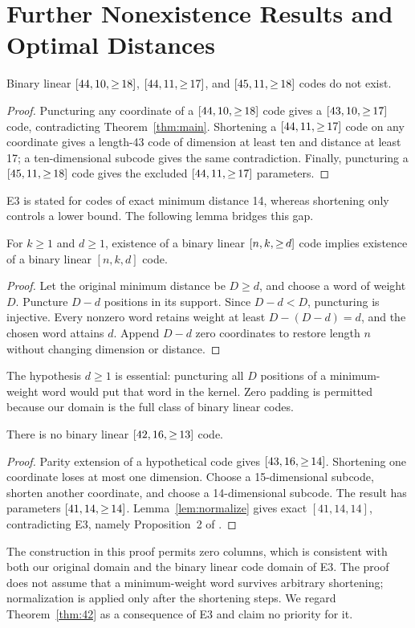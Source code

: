 \section{Further Nonexistence Results and Optimal Distances}
\label{sec:consequences}
\begin{corollary}\label{cor:three}
Binary linear $\mbox{\ensuremath{[44,10,{\ge}\,18]}}$, $\mbox{\ensuremath{[44,11,{\ge}\,17]}}$, and $\mbox{\ensuremath{[45,11,{\ge}\,18]}}$ codes do not exist.
\end{corollary}
\begin{proof}
Puncturing any coordinate of a $\mbox{\ensuremath{[44,10,{\ge}\,18]}}$ code gives a $\mbox{\ensuremath{[43,10,{\ge}\,17]}}$ code, contradicting Theorem~\ref{thm:main}. Shortening a $\mbox{\ensuremath{[44,11,{\ge}\,17]}}$ code on any coordinate gives a length-43 code of dimension at least ten and distance at least 17; a ten-dimensional subcode gives the same contradiction. Finally, puncturing a $\mbox{\ensuremath{[45,11,{\ge}\,18]}}$ code gives the excluded $\mbox{\ensuremath{[44,11,{\ge}\,17]}}$ parameters.
\end{proof}

E3 is stated for codes of exact minimum distance 14, whereas shortening only controls a lower bound. The following lemma bridges this gap.
\begin{lemma}\label{lem:normalize}
For ${k\ge1}$ and ${d\ge1}$, existence of a binary linear $\mbox{\ensuremath{[n,k,{\ge}\,d]}}$ code implies existence of a binary linear $[n,k,d]$ code.
\end{lemma}
\begin{proof}
Let the original minimum distance be $D\ge d$, and choose a word of weight $D$. Puncture $D-d$ positions in its support. Since $D-d<D$, puncturing is injective. Every nonzero word retains weight at least $D-(D-d)=d$, and the chosen word attains $d$. Append $D-d$ zero coordinates to restore length $n$ without changing dimension or distance.
\end{proof}
The hypothesis $d\ge1$ is essential: puncturing all $D$ positions of a minimum-weight word would put that word in the kernel. Zero padding is permitted because our domain is the full class of binary linear codes.

\begin{theorem}\label{thm:42}
There is no binary linear $\mbox{\ensuremath{[42,16,{\ge}\,13]}}$ code.
\end{theorem}
\begin{proof}
Parity extension of a hypothetical code gives $\mbox{\ensuremath{[43,16,{\ge}\,14]}}$. Shortening one coordinate loses at most one dimension. Choose a 15-dimensional subcode, shorten another coordinate, and choose a 14-dimensional subcode. The result has parameters $\mbox{\ensuremath{[41,14,{\ge}\,14]}}$. Lemma~\ref{lem:normalize} gives exact $[41,14,14]$, contradicting E3, namely Proposition~2 of \citet{bouyuklieva2020}.
\end{proof}
The construction in this proof permits zero columns, which is consistent with both our original domain and the binary linear code domain of E3. The proof does not assume that a minimum-weight word survives arbitrary shortening; normalization is applied only after the shortening steps. We regard Theorem~\ref{thm:42} as a consequence of E3 and claim no priority for it.

